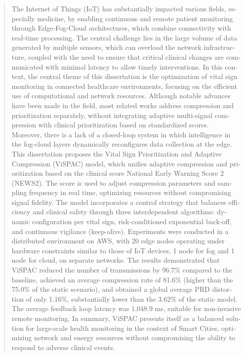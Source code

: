 \documentclass[twoside,english,brazilian]{UNISINOSmonografia}
\begin{document}
%
\begin{otherlanguage}{english}
\begin{abstract}
The Internet of Things (IoT) has substantially impacted various fields, especially medicine, by enabling continuous and remote patient monitoring through Edge-Fog-Cloud architectures, which combine connectivity with real-time processing. The central challenge lies in the large volume of data generated by multiple sensors, which can overload the network infrastructure, coupled with the need to ensure that critical clinical changes are communicated with minimal latency to allow timely interventions. In this context, the central theme of this dissertation is the optimization of vital sign monitoring in connected healthcare environments, focusing on the efficient use of computational and network resources. Although notable advances have been made in the field, most related works address compression and prioritization separately, without integrating adaptive multi-signal compression with clinical prioritization based on standardized scores. Moreover, there is a lack of a closed-loop system in which intelligence in the fog-cloud layers dynamically reconfigures data collection at the edge. This dissertation proposes the Vital Sign Prioritization and Adaptive Compression (ViSPAC) model, which unifies adaptive compression and prioritization based on the clinical score National Early Warning Score 2 (NEWS2). The score is used to adjust compression parameters and sampling frequency in real time, optimizing resources without compromising signal fidelity. The model incorporates a control strategy that balances efficiency and clinical safety through three interdependent algorithms: dynamic configuration per vital sign, risk-conditioned exponential back-off, and continuous vigilance (keep-alive). Experiments were conducted in a distributed environment on AWS, with 20 edge nodes operating under hardware constraints similar to those of IoT devices, 1 node for fog and 1 node for cloud, on separate networks. The results demonstrated that ViSPAC reduced the number of transmissions by 96.7\% compared to the baseline, achieved an average compression rate of 81.6\% (higher than the 75.0\% of the static scenario), and obtained a global average PRD distortion of only 1.16\%, substantially lower than the 3.62\% of the static model. The average feedback loop latency was 1,048.9 ms, suitable for non-invasive remote monitoring. In summary, ViSPAC presents itself as a balanced solution for large-scale health monitoring in the context of Smart Cities, optimizing network and energy resources without compromising the ability to respond to adverse clinical events.
\end{abstract}
\end{otherlanguage}
\end{document}
